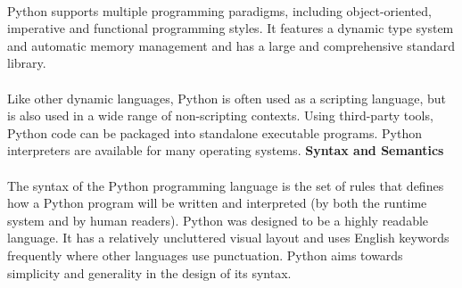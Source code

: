 \paragraph{} Python supports multiple programming paradigms, including object-oriented, imperative and functional programming styles. It features a dynamic type system and automatic memory management and has a large and comprehensive standard library.
\paragraph{} Like other dynamic languages, Python is often used as a scripting language, but is also used in a wide range of non-scripting contexts. Using third-party tools, Python code can be packaged into standalone executable programs. Python interpreters are available for many operating systems.
\textbf{Syntax and Semantics}
\paragraph{} The syntax of the Python programming language is the set of rules that defines how a Python program will be written and interpreted (by both the runtime system and by human readers). Python was designed to be a highly readable language. It has a relatively uncluttered visual layout and uses English keywords frequently where other languages use punctuation. Python aims towards simplicity and generality in the design of its syntax.
